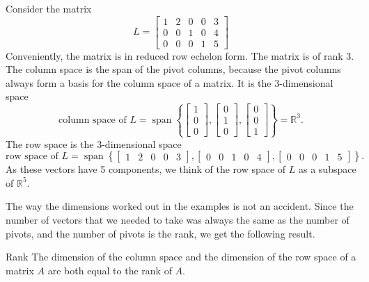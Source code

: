 \documentclass{ximera}
\begin{document}
\begin{example}
    Consider the matrix 
    \begin{equation*}
    L =
    \begin{bmatrix}
        {1} & 2 & 0 & 0 & 3 \\
        0 & 0 & {1} & 0 & 4 \\
        0 & 0 & 0 & {1} & 5
    \end{bmatrix} 
    \end{equation*}
    Conveniently, the matrix is in reduced row echelon form. The matrix is of rank 3. The column space is the span of the pivot columns, because the pivot columns always form a basis for the column space of a matrix. It is the 3-dimensional space
    \begin{equation*}
        \text{column space of $L$} = \operatorname{span} \left\{
        \begin{bmatrix}
            1 \\
            0 \\
            0
        \end{bmatrix} 
        ,
        \begin{bmatrix}
            0 \\
            1 \\
            0
        \end{bmatrix} 
        ,
        \begin{bmatrix}
            0 \\
            0 \\
            1
        \end{bmatrix} \right\}
        = {\mathbb{R}}^3 .
    \end{equation*}
    The row space is the 3-dimensional space
    \begin{equation*}
        \text{row space of $L$} = \operatorname{span} \left\{
        \begin{bmatrix}
            1 & 2 & 0 & 0 & 3
        \end{bmatrix} 
        ,
        \begin{bmatrix}
            0 & 0 & 1 & 0 & 4
        \end{bmatrix} 
        ,
        \begin{bmatrix}
            0 & 0 & 0 & 1 & 5
        \end{bmatrix}  \right\} .
    \end{equation*}
    As these vectors have 5 components, we think of the row space of $L$ as a subspace of ${\mathbb{R}}^5$.
\end{example}

The way the dimensions worked out in the examples is not  an accident.  Since the number of vectors that we needed to take was always the same as the number of pivots, and the number of pivots is the rank, we get the following result.

\begin{theorem}{Rank}
    The dimension of the column space and the dimension of the row space  of a matrix $A$ are both equal to the rank of $A$.
\end{theorem}
\end{document}
